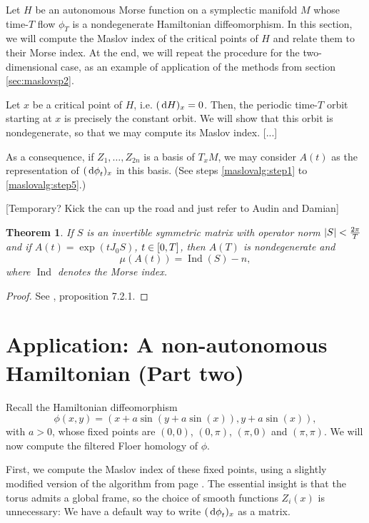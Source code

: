 \documentclass{article}
\newtheorem{theorem}{Theorem}
\theoremstyle{nonumberplain}
\newtheorem{proof}{Proof}
\DeclareMathOperator{\Ind}{Ind}
\DeclarePairedDelimiter{\norm}{\lvert}{\rvert}
\begin{document}
Let $H$ be an autonomous Morse function on a symplectic manifold $M$ whose time-$T$ flow $\phi_T$ is a nondegenerate Hamiltonian diffeomorphism. In this section, we will compute the Maslov index of the critical points of $H$ and relate them to their Morse index. At the end, we will repeat the procedure for the two-dimensional case, as an example of application of the methods from section \ref{sec:maslovsp2}.

Let $x$ be a critical point of $H$, i.e. $(\dl H)_x = 0$. Then, the periodic time-$T$ orbit starting at $x$ is precisely the constant orbit. We will show that this orbit is nondegenerate, so that we may compute its Maslov index.
[...]

As a consequence, if $Z_1, \dots, Z_{2n}$ is a basis of $T_x M$, we may consider $A(t)$ as the representation of $(\dl \phi_t)_x$ in this basis. (See steps \ref{maslovalg:step1} to \ref{maslovalg:step5}.)

[Temporary? Kick the can up the road and just refer to Audin and Damian]

\begin{theorem}
If $S$ is an invertible symmetric matrix with operator norm $\norm S < \frac{2\pi}T$ and if $A(t) = \exp(t J_0 S)$, $t \in \interval 0 T$, then $A(T)$ is nondegenerate and
\begin{equation}
\mu(A(t)) = \Ind(S) - n,
\end{equation}
where $\Ind$ denotes the Morse index.
\end{theorem}

\begin{proof}
See \cite{audin}, proposition 7.2.1.
\end{proof}

\section{Application: A non-autonomous Hamiltonian (Part two)}

Recall the Hamiltonian diffeomorphism
\begin{equation}
\phi(x,y) = ( x + a \sin(y + a \sin(x)), y + a \sin(x)),
\end{equation}
with $a > 0$, whose fixed points are $(0,0)$, $(0,\pi)$, $(\pi, 0)$ and $(\pi,\pi)$. We will now compute the filtered Floer homology of $\phi$.

First, we compute the Maslov index of these fixed points, using a slightly modified version of the algorithm from page \pageref{page:maslovalg}. The essential insight is that the torus admits a global frame, so the choice of smooth functions $Z_i(x)$ is unnecessary: We have a default way to write $(\dl \phi_t)_x$ as a matrix.
\end{document}
